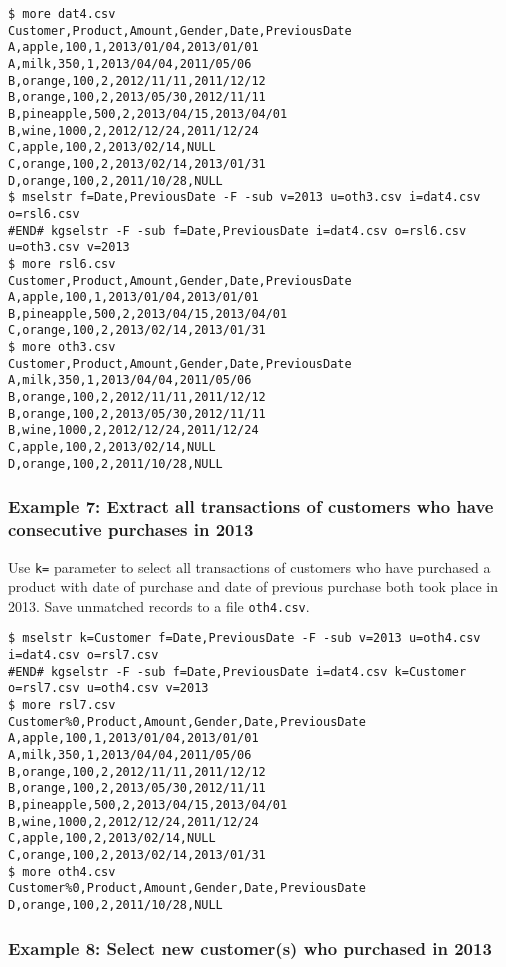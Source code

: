 \begin{Verbatim}[baselinestretch=0.7,frame=single]
$ more dat4.csv
Customer,Product,Amount,Gender,Date,PreviousDate
A,apple,100,1,2013/01/04,2013/01/01
A,milk,350,1,2013/04/04,2011/05/06
B,orange,100,2,2012/11/11,2011/12/12
B,orange,100,2,2013/05/30,2012/11/11
B,pineapple,500,2,2013/04/15,2013/04/01
B,wine,1000,2,2012/12/24,2011/12/24
C,apple,100,2,2013/02/14,NULL
C,orange,100,2,2013/02/14,2013/01/31
D,orange,100,2,2011/10/28,NULL
$ mselstr f=Date,PreviousDate -F -sub v=2013 u=oth3.csv i=dat4.csv o=rsl6.csv
#END# kgselstr -F -sub f=Date,PreviousDate i=dat4.csv o=rsl6.csv u=oth3.csv v=2013
$ more rsl6.csv
Customer,Product,Amount,Gender,Date,PreviousDate
A,apple,100,1,2013/01/04,2013/01/01
B,pineapple,500,2,2013/04/15,2013/04/01
C,orange,100,2,2013/02/14,2013/01/31
$ more oth3.csv
Customer,Product,Amount,Gender,Date,PreviousDate
A,milk,350,1,2013/04/04,2011/05/06
B,orange,100,2,2012/11/11,2011/12/12
B,orange,100,2,2013/05/30,2012/11/11
B,wine,1000,2,2012/12/24,2011/12/24
C,apple,100,2,2013/02/14,NULL
D,orange,100,2,2011/10/28,NULL
\end{Verbatim}
\subsubsection*{Example 7: Extract all transactions of customers who have consecutive purchases in 2013}

Use \verb|k=| parameter to select all transactions of customers who have purchased a product with date of purchase and date of previous purchase both took place in 2013. Save unmatched records to a file \verb|oth4.csv|.


\begin{Verbatim}[baselinestretch=0.7,frame=single]
$ mselstr k=Customer f=Date,PreviousDate -F -sub v=2013 u=oth4.csv i=dat4.csv o=rsl7.csv
#END# kgselstr -F -sub f=Date,PreviousDate i=dat4.csv k=Customer o=rsl7.csv u=oth4.csv v=2013
$ more rsl7.csv
Customer%0,Product,Amount,Gender,Date,PreviousDate
A,apple,100,1,2013/01/04,2013/01/01
A,milk,350,1,2013/04/04,2011/05/06
B,orange,100,2,2012/11/11,2011/12/12
B,orange,100,2,2013/05/30,2012/11/11
B,pineapple,500,2,2013/04/15,2013/04/01
B,wine,1000,2,2012/12/24,2011/12/24
C,apple,100,2,2013/02/14,NULL
C,orange,100,2,2013/02/14,2013/01/31
$ more oth4.csv
Customer%0,Product,Amount,Gender,Date,PreviousDate
D,orange,100,2,2011/10/28,NULL
\end{Verbatim}
\subsubsection*{Example 8: Select new customer(s) who purchased in 2013}

